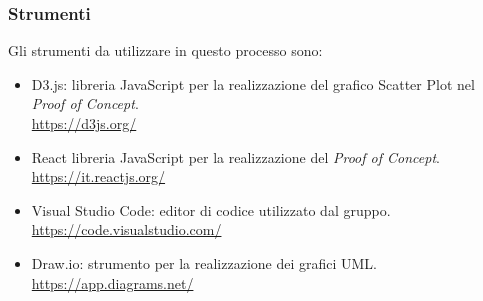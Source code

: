 \setlength\extrarowheight{0pt}

\subsubsection{Strumenti}
Gli strumenti da utilizzare in questo processo sono:
\begin{itemize}
    \item D3.js: libreria JavaScript per la realizzazione del grafico Scatter Plot nel \textit{Proof of Concept}.\\
    \href{https://d3js.org/}{https://d3js.org/}
    \item React  libreria JavaScript per la realizzazione del \textit{Proof of Concept}.\\
    \href{https://it.reactjs.org/}{https://it.reactjs.org/}
    \item Visual Studio Code: editor di codice utilizzato dal gruppo. \\
    \href{https://code.visualstudio.com/}{https://code.visualstudio.com/}
    \item Draw.io: strumento per la realizzazione dei grafici UML.\\
    \href{https://app.diagrams.net/}{https://app.diagrams.net/}
\end{itemize}
